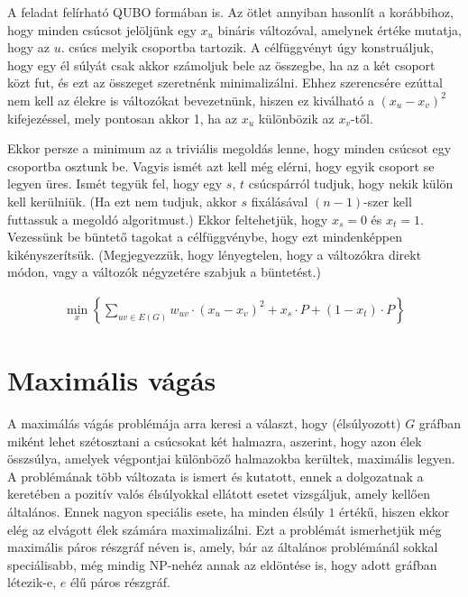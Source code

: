 A feladat felírható QUBO formában is. Az ötlet annyiban hasonlít a korábbihoz, hogy minden csúcsot jelöljünk egy $x_u$ bináris változóval, amelynek értéke mutatja, hogy az $u.$ csúcs melyik csoportba tartozik. A célfüggvényt úgy konstruáljuk, hogy egy él súlyát csak akkor számoljuk bele az összegbe, ha az a két csoport közt fut, és ezt az összeget szeretnénk minimalizálni. Ehhez szerencsére ezúttal nem kell az élekre is változókat bevezetnünk, hiszen ez kiválható a $(x_u-x_v)^2$ kifejezéssel, mely pontosan akkor 1, ha az $x_u$ különbözik az $x_v$-től.

Ekkor persze a minimum az a triviális megoldás lenne, hogy minden csúcsot egy csoportba osztunk be. Vagyis ismét azt kell még elérni, hogy egyik csoport se legyen üres.
Ismét tegyük fel, hogy egy $s$, $t$ csúcspárról tudjuk, hogy nekik külön kell kerülniük. (Ha ezt nem tudjuk, akkor $s$ fixálásával $(n-1)$-szer kell futtassuk a megoldó algoritmust.)
Ekkor feltehetjük, hogy $x_s=0$ és $x_t=1$.
Vezessünk be büntető tagokat a célfüggvénybe, hogy ezt mindenképpen kikényszerítsük. (Megjegyezzük, hogy lényegtelen, hogy a változókra direkt módon, vagy a változók négyzetére szabjuk a büntetést.)

\begin{align}
	\min_{x} \left\{ \sum_ {uv\in E(G)}{w_{uv}\cdot(x_u-x_v)^2} + x_s\cdot P + (1-x_t)\cdot P \right\}
\end{align}


\section{Maximális vágás}\label{sec:theoryMaxCut}

A maximálás vágás problémája arra keresi a választ, hogy (élsúlyozott) $G$ gráfban miként lehet szétosztani a csúcsokat két halmazra, aszerint, hogy azon élek összsúlya, amelyek végpontjai különböző halmazokba kerültek, maximális legyen. A problémának több változata is ismert és kutatott, ennek a dolgozatnak a keretében a pozitív valós élsúlyokkal ellátott esetet vizsgáljuk, amely kellően általános. Ennek nagyon speciális esete, ha minden élsúly $1$ értékű, hiszen ekkor elég az elvágott élek számára maximalizálni. Ezt a problémát ismerhetjük még maximális páros részgráf néven is, amely, bár az általános problémánál sokkal speciálisabb, még mindig NP-nehéz annak az eldöntése is, hogy adott gráfban létezik-e, $e$ élű páros részgráf.

